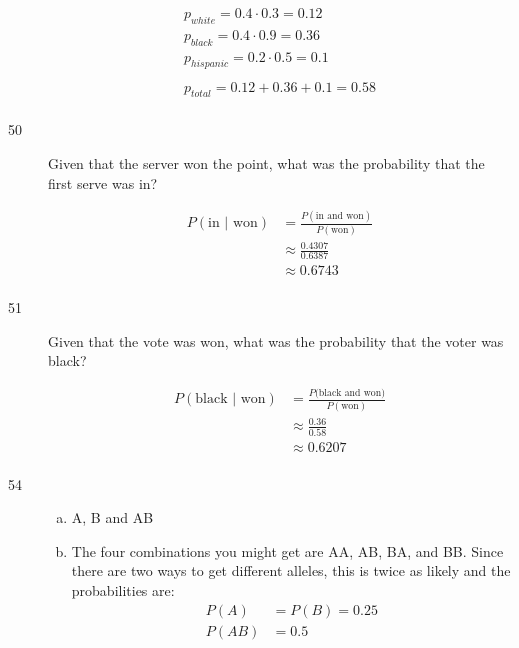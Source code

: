\documentclass[letterpaper, landscape]{exam}
\begin{document}
\begin{description}
      \begin{align*}
        p_{white} = 0.4 \cdot 0.3 = 0.12 \\
        p_{black} = 0.4 \cdot 0.9 = 0.36 \\
        p_{hispanic} = 0.2 \cdot 0.5 = 0.1 \\
        \\
        p_{total} = 0.12 + 0.36 + 0.1 = \boxed{ 0.58 } \\
      \end{align*}

    \item[50]
      Given that the server won the point, what was the probability that the first
      serve was in?

      \begin{align*}
        P(\text{in } | \text{ won}) & = \frac{P(\text{in and won})}{P(\text{won})} \\
                    & \approx \frac{0.4307}{0.6387} \\
                    & \approx \boxed{ 0.6743 } \\
      \end{align*}

    \newpage

    \item[51]
      Given that the vote was won, what was the probability that the voter was black?

      \begin{align*}
        P(\text{black } | \text{ won}) & = \frac{P(\text{black and won)}}{P(\text{won})} \\
                       & \approx \frac{0.36}{0.58} \\
                       & \approx \boxed{ 0.6207 } \\
      \end{align*}

    \item[54]
      \begin{enumerate}[(a)]
        \item A, B and AB

        \item
          The four combinations you might get are AA, AB, BA, and BB. Since there are 
          two ways to get different alleles, this is twice as likely and the probabilities
          are:
          \begin{align*}
            P(A)  & = P(B) = 0.25 \\
            P(AB) & = 0.5 \\
          \end{align*}
      \end{enumerate}


\end{description}
\end{document}
